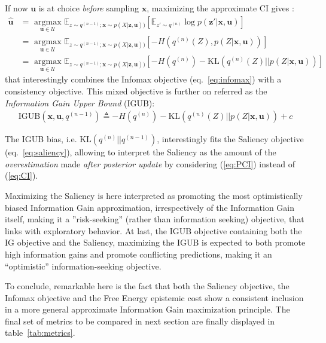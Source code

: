 \documentclass[12pt,twoside,openright]{article}
\begin{document}
{\color{Purple}If now $\boldsymbol{u}$ is at choice \emph{before} sampling  $\boldsymbol{x}$, maximizing the approximate CI} gives :
\begin{align}
	\hat{\boldsymbol{u}} 
	&= \underset{\boldsymbol{u} \in \mathcal{U}}{\text{ argmax }} \mathbb{E}_{z\sim q^{(n-1)}; \boldsymbol{x}\sim p(X|\boldsymbol{z},\boldsymbol{u}))} 
	\left[\mathbb{E}_{z'\sim q^{(n)} }\log p(\boldsymbol{z}'|\boldsymbol{x}, \boldsymbol{u})\right]\nonumber\\
	&= \underset{\boldsymbol{u} \in \mathcal{U}}{\text{ argmax }} \mathbb{E}_{z\sim q^{(n-1)}; \boldsymbol{x}\sim p(X|\boldsymbol{z},\boldsymbol{u}))} \left[-H(q^{(n)}(Z), p(Z|\boldsymbol{x}, \boldsymbol{u}))\right]\\
	&= \underset{\boldsymbol{u} \in \mathcal{U}}{\text{ argmax }} \mathbb{E}_{z\sim q^{(n-1)}; \boldsymbol{x}\sim p(X|\boldsymbol{z},\boldsymbol{u}))} \left[-H(q^{(n)}) - \text{KL}(q^{(n)}(Z)|| p(Z|\boldsymbol{x}, \boldsymbol{u}))\right]\label{eq:PC-pred}
\end{align}
that {\color{Purple} interestingly} combines the Infomax objective (eq.~\ref{eq:infomax}) with a consistency objective. This mixed objective is further on referred as the \emph{Information Gain Upper Bound} (IGUB):
\begin{align}\text{IGUB}(\boldsymbol{x}, \boldsymbol{u}, q^{(n-1)})\triangleq -H(q^{(n)}) - \text{KL}(q^{(n)}(Z)|| p(Z|\boldsymbol{x}, \boldsymbol{u})) + c \label{eq:PC}
\end{align}

{\color{Purple}The IGUB bias, i.e. $\text{KL} (q^{(n)}||q^{(n-1)})$, interestingly} fits the Saliency objective (eq.~\ref{eq:saliency}), allowing to interpret the Saliency as the amount of the \emph{overestimation} made \emph{after posterior update} by considering (\ref{eq:PCI}) instead of (\ref{eq:CI}).

{\color{Purple}Maximizing the Saliency is here interpreted as promoting the most optimistically biased Information Gain approximation, irrespectively of the Information Gain itself, making it a ''risk-seeking'' (rather than information seeking) objective, that links with exploratory behavior.}
{\color{Purple} At last, the IGUB objective containing both the IG objective and the Saliency, maximizing the IGUB is expected to both promote high information gains and promote conflicting predictions, making it an ``optimistic'' information-seeking objective.}

To conclude, remarkable here is the fact that both the Saliency objective, the Infomax  objective and the Free Energy epistemic cost show a consistent inclusion in a more general approximate Information Gain maximization principle. 
The final set of metrics to be compared in next section are finally displayed in table~\ref{tab:metrics}.
\end{document}
